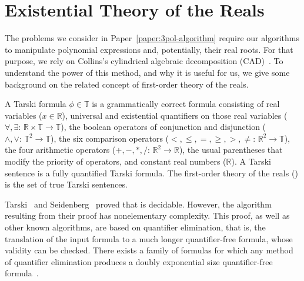 \chapter{Existential Theory of the Reals}
\label{chapter:etr}

The problems we consider
in Paper~\ref{paper:3pol-algorithm}
require our algorithms to manipulate polynomial
expressions and, potentially, their real roots. For that purpose, we rely
on Collins's cylindrical algebraic decomposition (CAD)~\cite{C75}.
%
To understand the power of this method, and why it is useful for us, we give some
background on the related concept of first-order theory of the reals.


\begin{definition}
	A Tarski formula $\phi \in \mathbb{T}$ is a grammatically correct formula
	consisting of real variables ($x \in \mathbb{R}$), universal and
	existential quantifiers on those real variables
	($\forall,\exists\colon\,\mathbb{R}\times\mathbb{T}\to\mathbb{T}$), the
	boolean operators of conjunction and disjunction
	($\land,\lor\colon\,\mathbb{T}^2\to\mathbb{T}$), the six comparison
	operators ($<,\le,=,\ge,>,\ne\colon\,\mathbb{R}^2\to\mathbb{T}$), the four
	arithmetic operators ($+,-,*,/\colon\,\mathbb{R}^2\to\mathbb{R}$), the
	usual parentheses that modify the priority of operators, and constant real
	numbers (\(\mathbb{R}\)).
	A Tarski sentence is a fully quantified Tarski formula.
	The first-order theory of the reals (\FOTR{}) is
	the set of true Tarski sentences.
\end{definition}

Tarski~\cite{T51} and Seidenberg~\cite{Sei74} proved that \FOTR{} is decidable.
However, the algorithm resulting from their proof has nonelementary complexity.
%
This proof, as well as other known algorithms, are based on quantifier
elimination, that is, the translation of the input formula to a much longer
quantifier-free formula, whose validity can be checked.
There exists a family of formulas for which any method of quantifier elimination
produces a doubly exponential size quantifier-free formula~\cite{DH88}.

